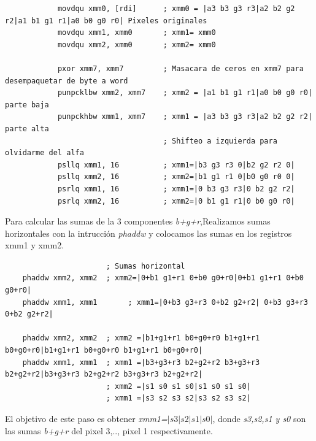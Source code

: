 \begin{codesnippet}
\begin{verbatim}
            movdqu xmm0, [rdi]      ; xmm0 = |a3 b3 g3 r3|a2 b2 g2 r2|a1 b1 g1 r1|a0 b0 g0 r0| Pixeles originales
            movdqu xmm1, xmm0       ; xmm1= xmm0
            movdqu xmm2, xmm0       ; xmm2= xmm0

            pxor xmm7, xmm7         ; Masacara de ceros en xmm7 para desempaquetar de byte a word
            punpcklbw xmm2, xmm7    ; xmm2 = |a1 b1 g1 r1|a0 b0 g0 r0| parte baja
            punpckhbw xmm1, xmm7    ; xmm1 = |a3 b3 g3 r3|a2 b2 g2 r2| parte alta
                                    ; Shifteo a izquierda para olvidarme del alfa
            psllq xmm1, 16          ; xmm1=|b3 g3 r3 0|b2 g2 r2 0|
            psllq xmm2, 16          ; xmm2=|b1 g1 r1 0|b0 g0 r0 0|
            psrlq xmm1, 16          ; xmm1=|0 b3 g3 r3|0 b2 g2 r2|
            psrlq xmm2, 16          ; xmm2=|0 b1 g1 r1|0 b0 g0 r0|
\end{verbatim}
\end{codesnippet}
Para calcular las sumas de la 3 componentes \emph{b+g+r},Realizamos sumas horizontales con la intrucción \emph{phaddw} y colocamos las sumas en los registros xmm1 y xmm2.
\begin{codesnippet}
\begin{verbatim}
                       ; Sumas horizontal
    phaddw xmm2, xmm2  ; xmm2=|0+b1 g1+r1 0+b0 g0+r0|0+b1 g1+r1 0+b0 g0+r0|
    phaddw xmm1, xmm1       ; xmm1=|0+b3 g3+r3 0+b2 g2+r2| 0+b3 g3+r3 0+b2 g2+r2|

    phaddw xmm2, xmm2  ; xmm2 =|b1+g1+r1 b0+g0+r0 b1+g1+r1 b0+g0+r0|b1+g1+r1 b0+g0+r0 b1+g1+r1 b0+g0+r0|
    phaddw xmm1, xmm1  ; xmm1 =|b3+g3+r3 b2+g2+r2 b3+g3+r3 b2+g2+r2|b3+g3+r3 b2+g2+r2 b3+g3+r3 b2+g2+r2|
                       ; xmm2 =|s1 s0 s1 s0|s1 s0 s1 s0|
                       ; xmm1 =|s3 s2 s3 s2|s3 s2 s3 s2|
\end{verbatim}
\end{codesnippet}

El objetivo de este paso es obtener \emph{xmm1=$|s3|s2|s1|s0|$}, donde \emph{s3,s2,s1 y s0} son las sumas \emph{b+g+r} del pixel 3,.., pixel 1 respectivamente.

